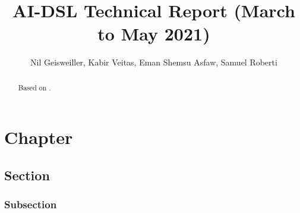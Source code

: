 \documentclass[]{report}
\begin{document}
\title{AI-DSL Technical Report (March to May 2021)}
\author{Nil Geisweiller, Kabir Veitas, Eman Shemsu Asfaw, Samuel Roberti}
\maketitle

\begin{abstract}
  Based on \cite{GoertzelGeisweillerBlog}.
\end{abstract}

\chapter{Chapter}
\section{Section}
\subsection{Subsection}



\end{document}
